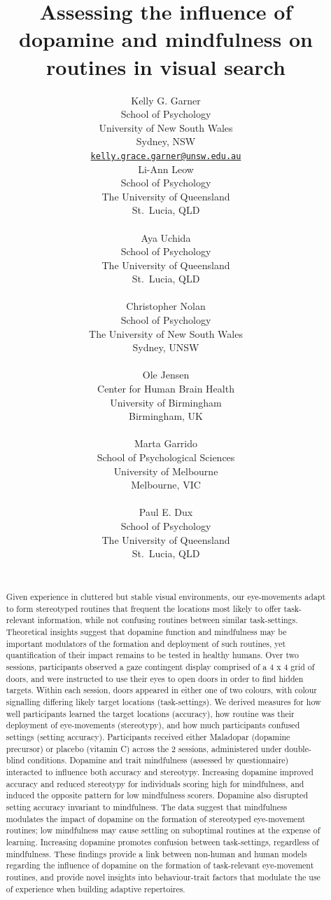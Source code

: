 \documentclass{article}
\title{Assessing the influence of dopamine and mindfulness on routines
in visual search}
\author{
    Kelly G. Garner
   \\
    School of Psychology \\
    University of New South Wales \\
  Sydney, NSW \\
  \texttt{\href{mailto:kelly.grace.garner@unsw.edu.au}{\nolinkurl{kelly.grace.garner@unsw.edu.au}}} \\
   \And
    Li-Ann Leow
   \\
    School of Psychology \\
    The University of Queensland \\
  St.~Lucia, QLD \\
  \texttt{} \\
   \And
    Aya Uchida
   \\
    School of Psychology \\
    The University of Queensland \\
  St.~Lucia, QLD \\
  \texttt{} \\
   \And
    Christopher Nolan
   \\
    School of Psychology \\
    The University of New South Wales \\
  Sydney, UNSW \\
  \texttt{} \\
   \And
    Ole Jensen
   \\
    Center for Human Brain Health \\
    University of Birmingham \\
  Birmingham, UK \\
  \texttt{} \\
   \And
    Marta Garrido
   \\
    School of Psychological Sciences \\
    University of Melbourne \\
  Melbourne, VIC \\
  \texttt{} \\
   \And
    Paul E. Dux
   \\
    School of Psychology \\
    The University of Queensland \\
  St.~Lucia, QLD \\
  \texttt{} \\
  }
\begin{document}
\maketitle


\begin{abstract}
Given experience in cluttered but stable visual environments, our
eye-movements adapt to form stereotyped routines that frequent the
locations most likely to offer task-relevant information, while not
confusing routines between similar task-settings. Theoretical insights
suggest that dopamine function and mindfulness may be important
modulators of the formation and deployment of such routines, yet
quantification of their impact remains to be tested in healthy humans.
Over two sessions, participants observed a gaze contingent display
comprised of a 4 x 4 grid of doors, and were instructed to use their
eyes to open doors in order to find hidden targets. Within each session,
doors appeared in either one of two colours, with colour signalling
differing likely target locations (task-settings). We derived measures
for how well participants learned the target locations (accuracy), how
routine was their deployment of eye-movements (stereotypy), and how much
participants confused settings (setting accuracy). Participants received
either Maladopar (dopamine precursor) or placebo (vitamin C) across the
2 sessions, administered under double-blind conditions. Dopamine and
trait mindfulness (assessed by questionnaire) interacted to influence
both accuracy and stereotypy. Increasing dopamine improved accuracy and
reduced stereotypy for individuals scoring high for mindfulness, and
induced the opposite pattern for low mindfulness scorers. Dopamine also
disrupted setting accuracy invariant to mindfulness. The data suggest
that mindfulness modulates the impact of dopamine on the formation of
stereotyped eye-movement routines; low mindfulness may cause settling on
suboptimal routines at the expense of learning. Increasing dopamine
promotes confusion between task-settings, regardless of mindfulness.
These findings provide a link between non-human and human models
regarding the influence of dopamine on the formation of task-relevant
eye-movement routines, and provide novel insights into behaviour-trait
factors that modulate the use of experience when building adaptive
repertoires.
\end{abstract}

\end{document}
